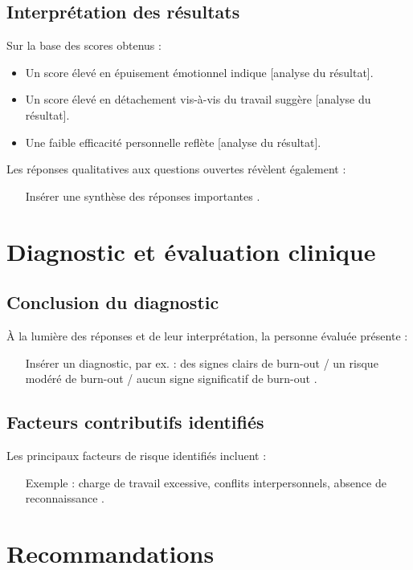 \documentclass[12pt,a4paper]{report}
\begin{document}
\section{Interprétation des résultats}
Sur la base des scores obtenus :
\begin{itemize}
    \item Un score élevé en épuisement émotionnel indique [analyse du résultat].
    \item Un score élevé en détachement vis-à-vis du travail suggère [analyse du résultat].
    \item Une faible efficacité personnelle reflète [analyse du résultat].
\end{itemize}

Les réponses qualitatives aux questions ouvertes révèlent également :
\begin{itemize}
    \item [Insérer une synthèse des réponses importantes].
\end{itemize}

\chapter{Diagnostic et évaluation clinique}

\section{Conclusion du diagnostic}
À la lumière des réponses et de leur interprétation, la personne évaluée présente :
\begin{itemize}
    \item [Insérer un diagnostic, par ex. : des signes clairs de burn-out / un risque modéré de burn-out / aucun signe significatif de burn-out].
\end{itemize}

\section{Facteurs contributifs identifiés}
Les principaux facteurs de risque identifiés incluent :
\begin{itemize}
    \item [Exemple : charge de travail excessive, conflits interpersonnels, absence de reconnaissance].
\end{itemize}

\chapter{Recommandations}
\end{document}

